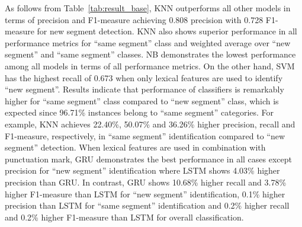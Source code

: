 \documentclass{amia}
\begin{document}
As follows from Table~\ref{tab:result_base}, KNN outperforms all other models in terms of precision and F1-measure achieving 0.808 precision with 0.728 F1-measure for new segment detection. KNN also shows superior performance in all performance metrics for ``same segment'' class and weighted average over ``new segment'' and ``same segment'' classes. NB demonstrates the lowest performance among all models in terms of all performance metrics. On the other hand, SVM has the highest recall of 0.673 when only lexical features are used to identify ``new segment''. Results indicate that performance of classifiers is remarkably higher for ``same segment'' class compared to ``new segment'' class, which is expected since 96.71\% instances belong to ``same segment'' categories. For example, KNN achieves 22.40\%, 50.07\% and 36.26\% higher precision, recall and F1-measure, respectively, in ``same segment'' identification compared to ``new segment'' detection. When lexical features are used in combination with punctuation mark, GRU demonstrates the best performance in all cases except precision for ``new segment'' identification where LSTM shows 4.03\% higher precision than GRU. In contrast, GRU shows 10.68\% higher recall and 3.78\%  higher F1-measure than LSTM for ``new segment'' identification, 0.1\% higher precision than LSTM for ``same segment'' identification and 0.2\% higher recall and 0.2\%  higher F1-measure than LSTM for overall classification. \\  

\end{document}
